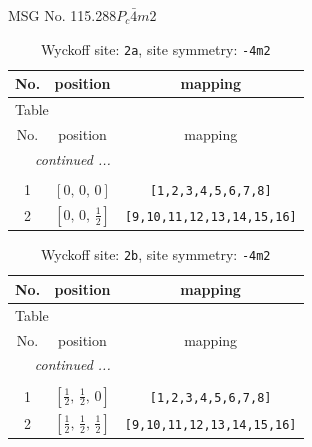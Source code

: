 \documentclass[fleqn,8pt]{jsarticle}
\begin{document}
\setcounter{MaxMatrixCols}{32}

\renewcommand{\tablename}{Table~}
\renewcommand{\figurename}{Figure~}
\begin{center}
\LARGE
MSG No. 115.288\quad$P_{c}\bar{4}m2$
\end{center}
\renewcommand{\arraystretch}{1.2}
\begin{longtable}{ccc}
\caption{Wyckoff site: {\tt 2a}, site symmetry: {\tt -4m2}}
 \\
 \hline \hline
No. & position & mapping \\ \hline \endfirsthead

\multicolumn{2}{l}{\tablename\ \thetable{}} \\
 \hline \hline
No. & position & mapping \\ \hline \endhead

 \hline \hline
\multicolumn{2}{r}{\footnotesize\it continued ...} \\ \endfoot

 \hline \hline
\multicolumn{2}{r}{} \\ \endlastfoot

1 & $\left[ 0,\, 0,\, 0 \right]$ & {\tt [1,2,3,4,5,6,7,8]} \\ \hline
2 & $\left[ 0,\, 0,\, \frac{1}{2} \right]$ & {\tt [9,10,11,12,13,14,15,16]} \\
\end{longtable}
\renewcommand{\arraystretch}{1.2}
\begin{longtable}{ccc}
\caption{Wyckoff site: {\tt 2b}, site symmetry: {\tt -4m2}}
 \\
 \hline \hline
No. & position & mapping \\ \hline \endfirsthead

\multicolumn{2}{l}{\tablename\ \thetable{}} \\
 \hline \hline
No. & position & mapping \\ \hline \endhead

 \hline \hline
\multicolumn{2}{r}{\footnotesize\it continued ...} \\ \endfoot

 \hline \hline
\multicolumn{2}{r}{} \\ \endlastfoot

1 & $\left[ \frac{1}{2},\, \frac{1}{2},\, 0 \right]$ & {\tt [1,2,3,4,5,6,7,8]} \\ \hline
2 & $\left[ \frac{1}{2},\, \frac{1}{2},\, \frac{1}{2} \right]$ & {\tt [9,10,11,12,13,14,15,16]} \\
\end{longtable}
\end{document}
